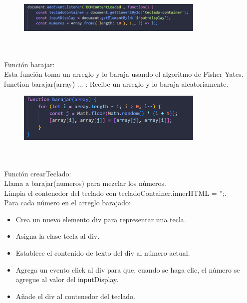 \documentclass{article}
\begin{document}
     \begin{figure}[H]
		          \centering
		          \includegraphics[width=0.8\textwidth,keepaspectratio]                       {img/eventoTeclado.png}
    \end{figure}
\\
\\Función barajar:
\\Esta función toma un arreglo y lo baraja usando el algoritmo de Fisher-Yates.
function barajar(array) { ... }: Recibe un arreglo y lo baraja aleatoriamente.
    \begin{figure}[H]
		          \centering
		          \includegraphics[width=0.8\textwidth,keepaspectratio]                       {img/barajarTeclado.png}
    \end{figure}
\\
\\Función crearTeclado:
\\Llama a barajar(numeros) para mezclar los números.
\\Limpia el contenedor del teclado con tecladoContainer.innerHTML = '';.
\\Para cada número en el arreglo barajado:
\begin{itemize}
    \item Crea un nuevo elemento div para representar una tecla.
    \item Asigna la clase tecla al div.
    \item Establece el contenido de texto del div al número actual.
    \item Agrega un evento click al div para que, cuando se haga clic, el número se agregue al valor del inputDisplay.
    \item Añade el div al contenedor del teclado.
\end{itemize}
\end{document}
